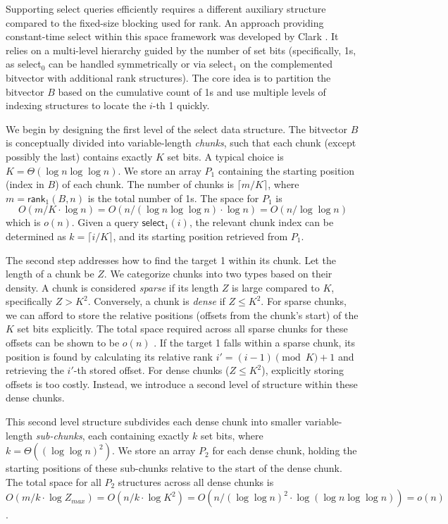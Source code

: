 Supporting \textsf{select} queries efficiently requires a different auxiliary structure compared to the fixed-size blocking used for \textsf{rank}. An approach providing constant-time select within this space framework was developed by Clark \cite{clark1997compact}. It relies on a multi-level hierarchy guided by the number of set bits (specifically, 1s, as \textsf{select}$_0$ can be handled symmetrically or via \textsf{select}$_1$ on the complemented bitvector with additional rank structures). The core idea is to partition the bitvector $B$ based on the cumulative count of 1s and use multiple levels of indexing structures to locate the $i$-th 1 quickly.

We begin by designing the first level of the select data structure. The bitvector $B$ is conceptually divided into variable-length \emph{chunks}, such that each chunk (except possibly the last) contains exactly $K$ set bits. A typical choice is $K = \Theta(\log n \log \log n)$. We store an array $P_1$ containing the starting position (index in $B$) of each chunk. The number of chunks is $\lceil m/K \rceil$, where $m = \textsf{rank}_1(B, n)$ is the total number of 1s. The space for $P_1$ is
\begin{equation*}
    O(m/K \cdot \log n) = O(n / (\log n \log \log n) \cdot \log n) = O(n / \log \log n)
\end{equation*}
which is $o(n)$. Given a query $\textsf{select}_1(i)$, the relevant chunk index can be determined as $k = \lceil i/K \rceil$, and its starting position retrieved from $P_1$.

The second step addresses how to find the target 1 within its chunk. Let the length of a chunk be $Z$. We categorize chunks into two types based on their density. A chunk is considered \emph{sparse} if its length $Z$ is large compared to $K$, specifically $Z > K^2$. Conversely, a chunk is \emph{dense} if $Z \le K^2$. For sparse chunks, we can afford to store the relative positions (offsets from the chunk's start) of the $K$ set bits explicitly. The total space required across all sparse chunks for these offsets can be shown to be $o(n)$ \cite{clark1997compact}. If the target 1 falls within a sparse chunk, its position is found by calculating its relative rank $i' = (i-1) \pmod K + 1$ and retrieving the $i'$-th stored offset. For dense chunks ($Z \le K^2$), explicitly storing offsets is too costly. Instead, we introduce a second level of structure within these dense chunks.

This second level structure subdivides each dense chunk into smaller variable-length \emph{sub-chunks}, each containing exactly $k$ set bits, where $k = \Theta((\log \log n)^2)$. We store an array $P_2$ for each dense chunk, holding the starting positions of these sub-chunks relative to the start of the dense chunk. The total space for all $P_2$ structures across all dense chunks is $O(m/k \cdot \log Z_{max}) = O(n/k \cdot \log K^2) = O(n / (\log \log n)^2 \cdot \log(\log n \log \log n)) = o(n)$.


